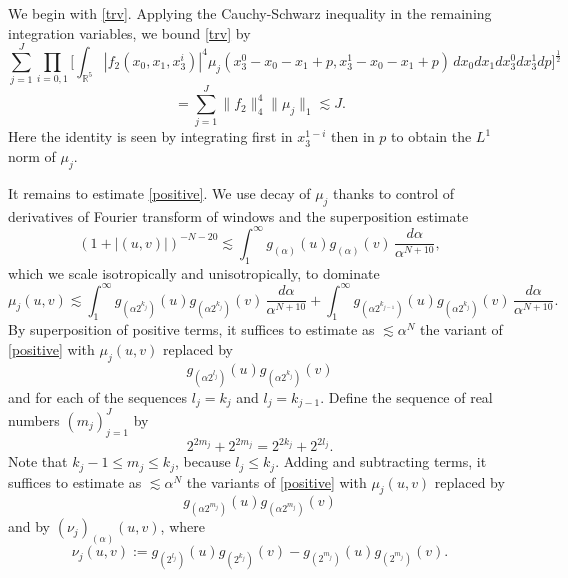 \documentclass[12pt,reqno]{amsart}
\theoremstyle{plain}
\theoremstyle{definition}
\numberwithin{equation}{section}
\newcommand{\R}{{\mathbb R}}
\begin{document}
We begin with  \eqref{trv}. Applying the  Cauchy-Schwarz inequality in the remaining integration variables,  we bound \eqref{trv}  by
\begin{equation*}
    \sum_{j=1}^J  \prod_{i=0,1} \Big[ \int_{\R^5}|f_2(x_0,x_1,x_3^i)|^4     
\mu_j(x_3^0-x_0-x_1+p,x_3^1-x_0-x_1+p)  \, dx_0 dx_1 dx_3^0 dx_3^1 dp \Big]^{\frac 12}   
\end{equation*}
\[= \sum_{j=1}^{J}\|f_2\|_4^4 \|\mu_j\|_1\lesssim J.\]
Here the identity is seen by integrating first 
in $x_3^{1-i}$ then in $p$ to obtain the $L^1$ norm of $\mu_j$.





It remains to estimate \eqref{positive}.
We use decay of $\mu_j$ thanks to control of derivatives of Fourier transform of windows and the superposition estimate
\begin{equation*}
    (1+|(u,v)|)^{-N-20} \lesssim \int_1^\infty g_{(\alpha)}(u)
    g_{(\alpha)}(v)
    \, \frac{d\alpha}{\alpha^{N+10}},
\end{equation*}
which we scale isotropically and unisotropically, to dominate
$$\mu_j(u,v)\lesssim
\int_{1}^\infty g_{(\alpha 2^{k_j})}(u) g_{(\alpha 2^{k_j})}(v) 
\, \frac{ d\alpha}{\alpha^{N+10}}
 +\int_1^\infty g_{(\alpha 2^{k_{j-1}})}(u) g_{(\alpha 2^{k_{j}})}(v) 
\,  \frac{ d\alpha}{\alpha^{N+10}}.
 $$
By superposition of positive terms, it suffices to estimate as
$\lesssim \alpha^{N}$ the variant of \eqref{positive} with  $\mu_j(u,v)$ replaced by
$$g_{(\alpha2^{l_j})}(u)g_{(\alpha2^{k_{j}})}(v)$$
and for each of the sequences $l_j=k_j$ and $l_j=k_{j-1}$. 
Define the sequence of real numbers $(m_j)_{j=1}^J$ by
$$2^{2m_j}+2^{2m_j}=2^{2k_j}+ 2^{2l_j}.$$
Note that $k_j-1\le m_j\le k_j$, because $l_j\le k_j$.
Adding and subtracting terms, it suffices to estimate as
$\lesssim \alpha^{N}$ the variants of \eqref{positive} 
with  $\mu_j(u,v)$ replaced by
\begin{equation}\label{symmw}
    g_{(\alpha 2^{m_j})}(u)g_{(\alpha 2^{m_j})}(v)
\end{equation}
and by $(\nu_j)_{(\alpha)}(u,v)$, where
\begin{equation}\label{diffw}
\nu_j(u,v):= 
g_{( 2^{l_j})}(u)g_{( 2^{k_j})}(v)-
 g_{( 2^{m_j})}(u)g_{( 2^{m_j})}(v).
\end{equation}
 
\end{document}
